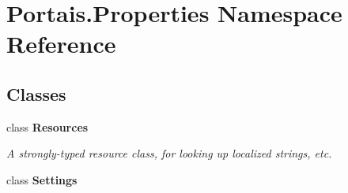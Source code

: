 \hypertarget{namespace_portais_1_1_properties}{}\section{Portais.\+Properties Namespace Reference}
\label{namespace_portais_1_1_properties}
\subsection*{Classes}
\begin{DoxyCompactItemize}
\item 
class {\bfseries Resources}
\begin{DoxyCompactList}\small\item\em A strongly-\/typed resource class, for looking up localized strings, etc. \end{DoxyCompactList}\item 
class {\bfseries Settings}
\end{DoxyCompactItemize}
